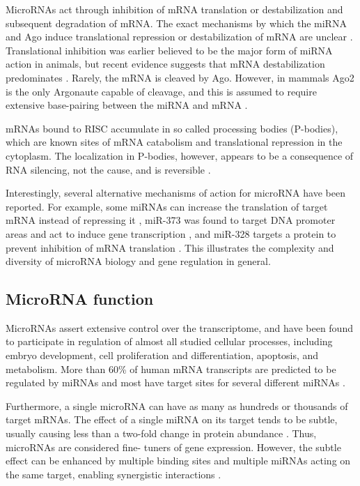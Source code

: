 MicroRNAs act through inhibition of mRNA translation or destabilization and
subsequent degradation of mRNA. The exact mechanisms by which the miRNA and
Ago induce translational repression or destabilization of mRNA are unclear
\citep{Filipowicz2008}. Translational inhibition was earlier believed to be
the major form of miRNA action in animals, but recent evidence suggests that
mRNA destabilization predominates \citep{Guo2010}. Rarely, the mRNA is
cleaved by Ago. However, in mammals Ago2 is the only Argonaute capable of
cleavage, and this is assumed to require extensive base-pairing between
the miRNA and mRNA \citep{Du2005}.

mRNAs bound to RISC accumulate in so called processing bodies (P-bodies),
which are known sites of mRNA catabolism and translational repression in the
cytoplasm. The localization in P-bodies, however, appears to be a consequence
of RNA silencing, not the cause, and is reversible \citep{Eulalio2007}.

Interestingly, several alternative mechanisms of action for microRNA have been
reported. For example, some miRNAs can increase the translation of target mRNA instead of
repressing it \citep{Vasudevan2007}, miR-373
was found to target DNA promoter areas and act to induce gene transcription
\citep{Place2008}, and miR-328 targets a protein to prevent inhibition of mRNA
translation \citep{Eiring2010}. This illustrates the complexity and diversity of
microRNA biology and gene regulation in general.




\subsection{MicroRNA function}\label{microrna-function}

MicroRNAs assert extensive control over the transcriptome, and have been found
to participate in regulation of almost all studied cellular processes,
including embryo development, cell proliferation and differentiation,
apoptosis, and metabolism. More than 60\% of human mRNA transcripts are
predicted to be regulated by miRNAs and most have target sites for several
different miRNAs \citep{Friedman2009}.

Furthermore, a single microRNA can have
as many as hundreds or thousands of target mRNAs. The effect of a single miRNA
on its target tends to be subtle, usually causing less than a two-fold change
in protein abundance \citep{Baek2008}. Thus, microRNAs are considered fine-
tuners of gene expression. However, the subtle effect can be enhanced by
multiple binding sites and multiple miRNAs acting on the same target, enabling
synergistic interactions \citep{Bartel2009}.

